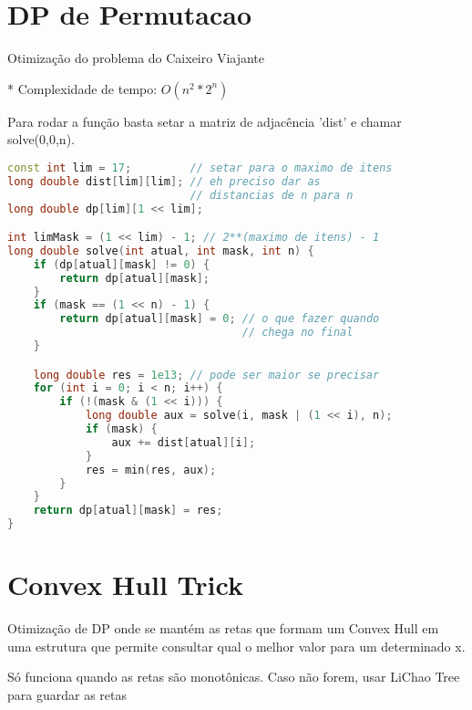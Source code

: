 \documentclass[11pt, a4paper, oneside]{book}
\begin{document}
\hfill

\section{DP de Permutacao}


Otimização do problema do Caixeiro Viajante



* Complexidade de tempo: $O(n^2 * 2^n)$



Para rodar a função basta setar a matriz de adjacência 'dist' e chamar solve(0,0,n).

\hfill

\begin{multicols}{2}
\begin{lstlisting}[language=C++]
const int lim = 17;         // setar para o maximo de itens
long double dist[lim][lim]; // eh preciso dar as
                            // distancias de n para n
long double dp[lim][1 << lim];

int limMask = (1 << lim) - 1; // 2**(maximo de itens) - 1
long double solve(int atual, int mask, int n) {
    if (dp[atual][mask] != 0) {
        return dp[atual][mask];
    }
    if (mask == (1 << n) - 1) {
        return dp[atual][mask] = 0; // o que fazer quando
                                    // chega no final
    }

    long double res = 1e13; // pode ser maior se precisar
    for (int i = 0; i < n; i++) {
        if (!(mask & (1 << i))) {
            long double aux = solve(i, mask | (1 << i), n);
            if (mask) {
                aux += dist[atual][i];
            }
            res = min(res, aux);
        }
    }
    return dp[atual][mask] = res;
}
\end{lstlisting}
\end{multicols}

\hfill

\section{Convex Hull Trick}


Otimização de DP onde se mantém as retas que formam um Convex Hull em uma estrutura que permite consultar qual o melhor valor para um determinado x.



Só funciona quando as retas são monotônicas. Caso não forem, usar LiChao Tree para guardar as retas
\end{document}
